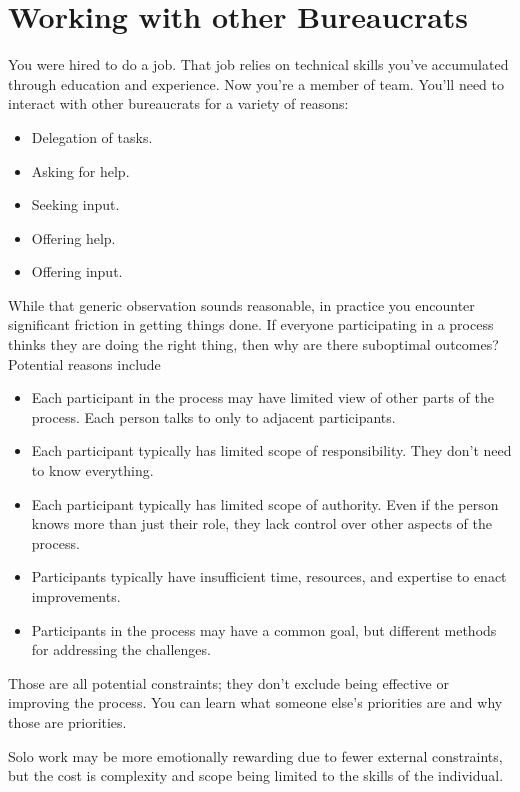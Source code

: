 \chapter{Working with other Bureaucrats\label{sec:working-with-other-bureaucrats}}

You were hired to do a job. That job relies on technical skills you've accumulated through education and experience. Now you're a member of team. You'll need to interact with other bureaucrats for a variety of reasons:
\begin{itemize}
    \item Delegation of tasks.
    \item Asking for help.
    \item Seeking input.
    \item Offering help.
    \item Offering input.
\end{itemize}
While that generic observation sounds reasonable, in practice you encounter significant friction in getting things done. 
If everyone participating in a process thinks they are doing the right thing, then why are there suboptimal outcomes? Potential reasons include
\begin{itemize}
    \item Each participant in the process may have limited view of other parts of the process. Each person talks to only to adjacent participants.
    \item Each participant typically has limited scope of responsibility. They don't need to know everything. 
    \item Each participant typically has limited scope of authority. Even if the person knows more than just their role, they lack control over other aspects of the process.
    \item Participants typically have insufficient time, resources, and expertise to enact improvements.
    \item Participants in the process may have a common goal, but different methods for addressing the challenges.
\end{itemize}
Those are all potential constraints; they don't exclude being effective or improving the process. 
You can learn what someone else's priorities are and why those are priorities.

Solo work may be more emotionally rewarding due to fewer external constraints, but the cost is complexity and scope being limited to the skills of the individual. 


